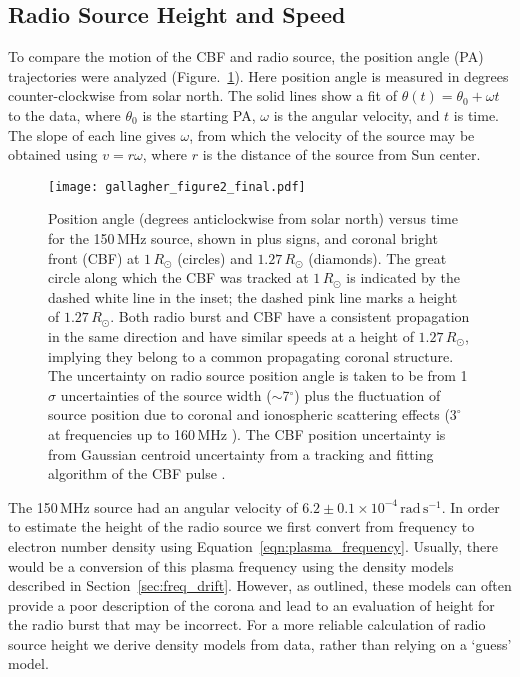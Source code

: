 \subsection{Radio Source Height and Speed}
To compare the motion of the CBF and radio source, the position angle (PA) trajectories were analyzed (Figure.~\ref{fig:angle_time}). Here position angle is measured in degrees counter-clockwise from solar north. The solid lines show a fit of $\theta(t) = \theta_0 + \omega t$ to the data, where $\theta_0$ is the starting PA, $\omega$ is the angular velocity, and $t$ is time. The slope of each line gives $\omega$, from which the velocity of the source may be obtained using $v=r\omega$, where $r$ is the distance of the source from Sun center. 
\begin{figure}[!t]
\begin{center}
\texttt{[image: gallagher\_figure2\_final.pdf]}
\caption[Radio source and CBF position angle versus time]{Position angle (degrees anticlockwise from solar north) versus time for the 150\,MHz source, shown in plus signs, and coronal bright front (CBF) at $1\,R_{\odot}$ (circles) and $1.27\,R_{\odot}$ (diamonds). The great circle along which the CBF was tracked at $1\,R_{\odot}$ is indicated by the dashed white line in the inset; the dashed pink line marks a height of $1.27\,R_{\odot}$. Both radio burst and CBF have a consistent propagation in the same direction and have similar speeds at a height of $1.27\,R_{\odot}$, implying they belong to a common propagating coronal structure. The uncertainty on radio source position angle is taken to be from 1$\sigma$ uncertainties of the source width ($\sim$7$^{\circ}$) plus the fluctuation of source position due to coronal and ionospheric scattering effects ($3^{\circ}$ at frequencies up to 160\,MHz \citep{stewart1982}). The CBF position uncertainty is from Gaussian centroid uncertainty from a tracking and fitting algorithm of the CBF pulse \citep{long2011a}.}
\label{fig:angle_time}
\end{center}
\end{figure}

The 150\,MHz source had an angular velocity of $6.2\pm0.1\times10^{-4}\,\mathrm{rad\,s^{-1}} $. In order to estimate the height of the radio source we first convert from frequency to electron number density using Equation~\ref{eqn:plasma_frequency}. Usually, there would be a conversion of this plasma frequency using the density models described in Section~\ref{sec:freq_drift}. However, as outlined, these models can often provide a poor description of the corona and lead to an evaluation of height for the radio burst that may be incorrect. For a more reliable calculation of radio source height we derive density models from data, rather than relying on a `guess' model.

